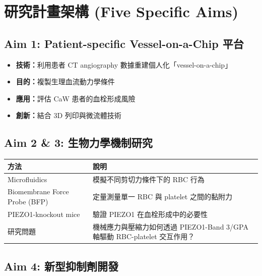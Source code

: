 \documentclass[12pt,a4paper]{article}
\begin{document}

\section{研究計畫架構 (Five Specific Aims)}

\subsection{Aim 1: Patient-specific Vessel-on-a-Chip 平台}

\begin{itemize}[leftmargin=2em]
    \item \textbf{技術：}利用患者 CT angiography 數據重建個人化「vessel-on-a-chip」
    \item \textbf{目的：}複製生理血流動力學條件
    \item \textbf{應用：}評估 CaW 患者的血栓形成風險
    \item \textbf{創新：}結合 3D 列印與微流體技術
\end{itemize}

\subsection{Aim 2 \& 3: 生物力學機制研究}

\begin{longtable}{p{3cm}p{11cm}}
\toprule
\textbf{方法} & \textbf{說明} \\
\midrule
\endfirsthead
Microfluidics & 模擬不同剪切力條件下的 RBC 行為 \\
\midrule
Biomembrane Force Probe (BFP) & 定量測量單一 RBC 與 platelet 之間的黏附力 \\
\midrule
PIEZO1-knockout mice & 驗證 PIEZO1 在血栓形成中的必要性 \\
\midrule
研究問題 & 機械應力與壓縮力如何透過 PIEZO1-Band 3/GPA 軸驅動 RBC-platelet 交互作用？ \\
\bottomrule
\end{longtable}

\subsection{Aim 4: 新型抑制劑開發}
\end{document}
